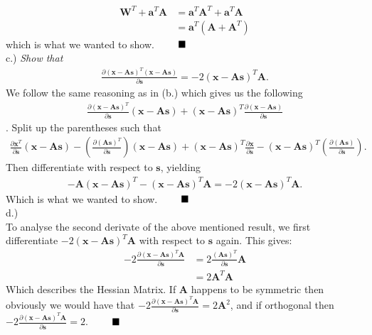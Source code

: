 \documentclass[12pt,
               a4paper,
               article,
               oneside,
               norsk,oldfontcommands]{memoir}
\newcommand{\Q}{ \qquad \hfill \blacksquare}
\newcommand{\spaze}{\vspace{4mm}\\}
\begin{document}
\begin{align*}
\mathbf{W}^T + \mathbf{a}^T \mathbf{A} &= \mathbf{a}^T \mathbf{A}^T + \mathbf{a}^T \mathbf{A} \\[5pt] 
&= \mathbf{a}^T (\mathbf{A} + \mathbf{A}^T)
\end{align*}
which is what we wanted to show. $\Q$ \spaze 
c.) \emph{Show that} 
\begin{align*}
\frac{\partial \left(\mathbf{x}-\mathbf{A}\mathbf{s}\right)^T\left(\mathbf{x}-\mathbf{A}\mathbf{s}\right)}{\partial \mathbf{s}} = -2\left(\mathbf{x}-\mathbf{A}\mathbf{s}\right)^T\mathbf{A}.
\end{align*}
We follow the same reasoning as in (b.) which gives us the following 
\begin{align*}
\frac{\partial \left(\mathbf{x}-\mathbf{A}\mathbf{s}\right)^T}{\partial \mathbf{s}} \left(\mathbf{x}-\mathbf{A}\mathbf{s}\right) + \left(\mathbf{x}-\mathbf{A}\mathbf{s}\right)^T \frac{\partial \left(\mathbf{x}-\mathbf{A}\mathbf{s}\right)}{\partial \mathbf{s}}
\end{align*}.
Split up the parentheses such that 
\begin{align*}
\frac{\partial \mathbf{x}^T}{\partial \mathbf{s}} \left(\mathbf{x}-\mathbf{A}\mathbf{s}\right) - \left( \frac{\partial \left(\mathbf{A}\mathbf{s}\right)^T}{\partial \mathbf{s}} \right) \left(\mathbf{x}-\mathbf{A}\mathbf{s}\right) + 
\left(\mathbf{x}-\mathbf{A}\mathbf{s}\right)^T \frac{\partial \mathbf{x}}{\partial \mathbf{s}} - \left(\mathbf{x}-\mathbf{A}\mathbf{s}\right)^T \left(\frac{\partial \left(\mathbf{A}\mathbf{s}\right)}{\partial \mathbf{s}} \right).
\end{align*}
Then differentiate with respect to $\mathbf{s}$, yielding 
\begin{align*}
- \mathbf{A}( \mathbf{x} - \mathbf{A}\mathbf{s})^T - ( \mathbf{x} - \mathbf{A}\mathbf{s})^T \mathbf{A}  = -2( \mathbf{x} - \mathbf{A}\mathbf{s})^T  \mathbf{A}.
\end{align*}
Which is what we wanted to show. $\Q$ \spaze 
d.) \spaze 
To analyse the second derivate of the above mentioned result, we first differentiate $-2( \mathbf{x} - \mathbf{A}\mathbf{s})^T  \mathbf{A}$ with respect to $\mathbf{s}$ again. This gives: 
\begin{align*}
-2 \frac{\partial (\mathbf{x} - \mathbf{A}\mathbf{s})^T  \mathbf{A}}{\partial \mathbf{s}} &= 2 \frac{(\mathbf{A} \mathbf{s})^T}{\partial \mathbf{s}} \mathbf{A} \\[5pt]
&= 2 \mathbf{A}^T \mathbf{A}
\end{align*}
Which describes the Hessian Matrix. If $\mathbf{A}$ happens to be symmetric then obviously we would have that $-2 \frac{\partial (\mathbf{x} - \mathbf{A}\mathbf{s})^T  \mathbf{A}}{\partial \mathbf{s}} = 2 \mathbf{A}^2$, and if orthogonal then $-2 \frac{\partial (\mathbf{x} - \mathbf{A}\mathbf{s})^T  \mathbf{A}}{\partial \mathbf{s}} = 2 $. $\Q$
\end{document}
